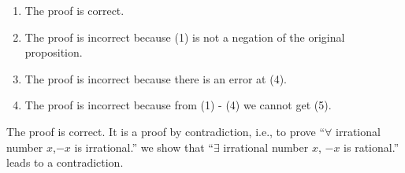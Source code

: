 \documentclass[11pt, preview]{standalone} %
\begin{document}
\begin{enumerate}
  \begin{Choices}
    \begin{enumerate}
    \TrueChoice\item The proof is correct.
    \FalseChoice\item The proof is incorrect because (1) is not a negation of the
      original proposition.
    \FalseChoice\item The proof is incorrect because there is an error at (4).
    \FalseChoice\item The proof is incorrect because from (1) - (4) we cannot get (5).
    \end{enumerate}
    \Solution The proof is correct. It is a proof by contradiction, 
    i.e., to prove ``$\forall$ irrational number $x$,$-x$ is irrational.''
    we show that ``$\exists$ irrational number $x$, $-x$ is rational.''
    leads to a contradiction.
  \end{Choices}

\end{enumerate}
\end{document}
